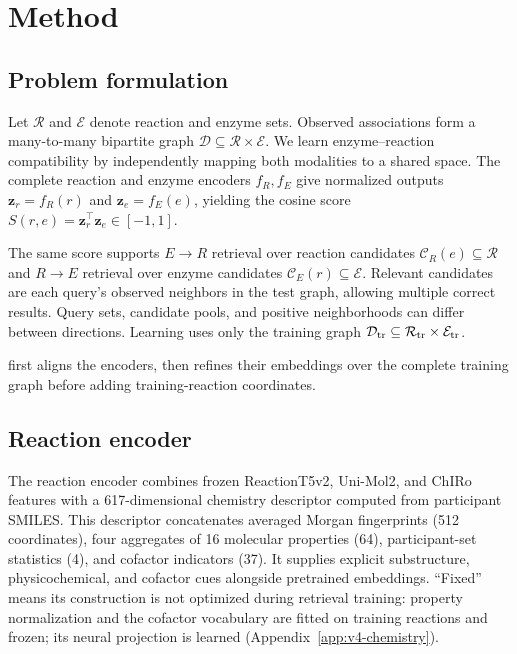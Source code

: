 \section{Method}
\label{sec:paper-v4-method}

\subsection{Problem formulation}
\label{sec:problem-formulation}
Let $\mathcal R$ and $\mathcal E$ denote reaction and enzyme sets. Observed
associations form a many-to-many bipartite graph
$\mathcal D\subseteq\mathcal R\times\mathcal E$. We learn enzyme--reaction
compatibility by independently mapping both modalities to a shared space.
The complete reaction and enzyme encoders $f_R,f_E$ give normalized outputs
$\mathbf{z}_r=f_R(r)$ and $\mathbf{z}_e=f_E(e)$, yielding the cosine score
$S(r,e)=\mathbf{z}_r^\top\mathbf{z}_e\in[-1,1]$.

The same score supports $E\!\to\!R$ retrieval over reaction candidates
$\mathcal C_R(e)\subseteq\mathcal R$ and $R\!\to\!E$ retrieval over enzyme
candidates $\mathcal C_E(r)\subseteq\mathcal E$. Relevant candidates are each
query's observed neighbors in the test graph, allowing multiple correct
results. Query sets, candidate pools, and positive neighborhoods can differ
between directions. Learning uses only the training graph
$\mathcal{D}_{\mathrm{tr}}\subseteq\mathcal{R}_{\mathrm{tr}}\times\mathcal{E}_{\mathrm{tr}}$.

\method{} first aligns the encoders, then refines their embeddings over
the complete training graph before adding training-reaction coordinates.



\subsection{Reaction encoder}
\label{sec:reaction-encoder}
The reaction encoder combines frozen ReactionT5v2, Uni-Mol2, and ChIRo features
\citep{sagawa2023reactiont5,ji2024unimol2,adams2022chiro} with a
617-dimensional chemistry descriptor computed from participant SMILES.
This descriptor concatenates averaged Morgan fingerprints (512 coordinates),
four aggregates of 16 molecular properties (64), participant-set statistics
(4), and cofactor indicators (37). It supplies explicit substructure,
physicochemical, and cofactor cues alongside pretrained embeddings.
``Fixed'' means its construction is not optimized during retrieval training:
property normalization and the cofactor vocabulary are fitted on training
reactions and frozen; its neural projection is learned
(Appendix~\ref{app:v4-chemistry}).

